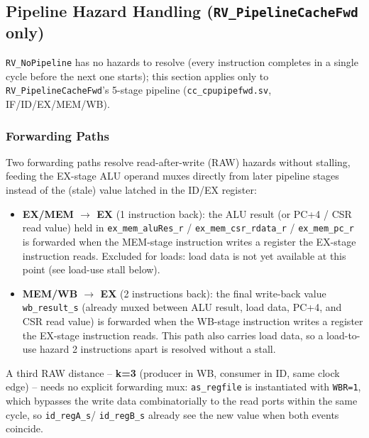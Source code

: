 \subsection{Pipeline Hazard Handling (\texttt{RV\_PipelineCacheFwd} only)}
\label{subsec:pipehazard}

\texttt{RV\_NoPipeline} has no hazards to resolve (every instruction
completes in a single cycle before the next one starts); this section
applies only to \texttt{RV\_PipelineCacheFwd}'s 5-stage pipeline
(\texttt{cc\_cpupipefwd.sv}, IF/ID/EX/MEM/WB).

\subsubsection{Forwarding Paths}

Two forwarding paths resolve read-after-write (RAW) hazards without
stalling, feeding the EX-stage ALU operand muxes directly from later
pipeline stages instead of the (stale) value latched in the ID/EX
register:

\begin{itemize}
  \item \textbf{EX/MEM $\rightarrow$ EX} (1 instruction back): the
    ALU result (or PC+4 / CSR read value) held in \texttt{ex\_mem\_aluRes\_r}
    / \texttt{ex\_mem\_csr\_rdata\_r} / \texttt{ex\_mem\_pc\_r} is forwarded
    when the MEM-stage instruction writes a register the EX-stage
    instruction reads. Excluded for loads: load data is not yet available
    at this point (see load-use stall below).
  \item \textbf{MEM/WB $\rightarrow$ EX} (2 instructions back): the final
    write-back value \texttt{wb\_result\_s} (already muxed between ALU
    result, load data, PC+4, and CSR read value) is forwarded when the
    WB-stage instruction writes a register the EX-stage instruction reads.
    This path also carries load data, so a load-to-use hazard 2 instructions
    apart is resolved without a stall.
\end{itemize}

A third RAW distance -- \textbf{k=3} (producer in WB, consumer in ID, same
clock edge) -- needs no explicit forwarding mux: \texttt{as\_regfile} is
instantiated with \texttt{WBR=1}, which bypasses the write data
combinatorially to the read ports within the same cycle, so \texttt{id\_regA\_s}/
\texttt{id\_regB\_s} already see the new value when both events coincide.

